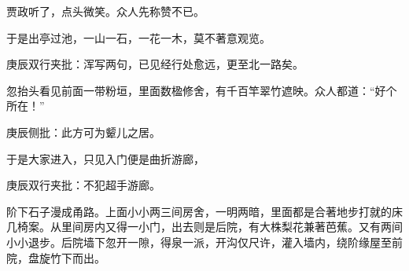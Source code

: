 \begin{parag}
    贾政听了，点头微笑。众人先称赞不已。
\end{parag}


\begin{parag}
    于是出亭过池，一山一石，一花一木，莫不著意观览。\begin{note}庚辰双行夹批：浑写两句，已见经行处愈远，更至北一路矣。\end{note}忽抬头看见前面一带粉垣，里面数楹修舍，有千百竿翠竹遮映。众人都道：“好个所在！”\begin{note}庚辰侧批：此方可为颦儿之居。\end{note}于是大家进入，只见入门便是曲折游廊，\begin{note}庚辰双行夹批：不犯超手游廊。\end{note}阶下石子漫成甬路。上面小小两三间房舍，一明两暗，里面都是合著地步打就的床几椅案。从里间房内又得一小门，出去则是后院，有大株梨花兼著芭蕉。又有两间小小退步。后院墙下忽开一隙，得泉一派，开沟仅尺许，灌入墙内，绕阶缘屋至前院，盘旋竹下而出。
\end{parag}


